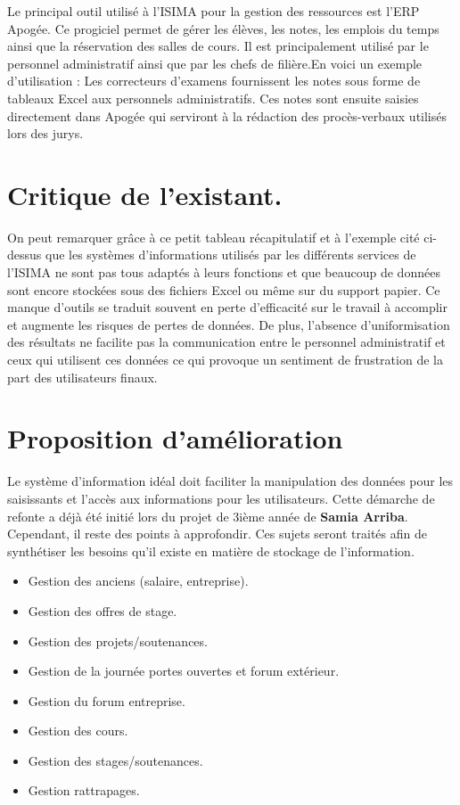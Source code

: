 \documentclass[a4paper,11pt]{report}
\begin{document}
\normalsize{
Le principal outil utilisé à l'ISIMA pour la gestion des ressources est l'ERP Apogée. Ce progiciel permet de gérer les élèves, les notes, les emplois du temps ainsi que la réservation des salles de cours. Il est principalement utilisé par le personnel administratif ainsi que par les chefs de filière.En voici un exemple d'utilisation : Les correcteurs d'examens fournissent les notes sous forme de tableaux Excel aux personnels administratifs. Ces notes sont ensuite saisies directement dans Apogée qui serviront à la rédaction des procès-verbaux utilisés lors des jurys. 
}

\section{Critique de l'existant.}
\normalsize{
On peut remarquer grâce à ce petit tableau récapitulatif et à l'exemple cité ci-dessus que les systèmes d'informations utilisés par les différents services de l'ISIMA ne sont pas tous adaptés à leurs fonctions et que beaucoup de données sont encore stockées sous des fichiers Excel ou même sur du support papier. Ce manque d'outils se traduit souvent en perte d'efficacité sur le travail à accomplir et augmente les risques de pertes de données. De plus, l'absence d'uniformisation des résultats ne facilite pas la communication entre le personnel administratif et ceux qui utilisent ces données ce qui provoque un sentiment de frustration de la part des utilisateurs finaux. \\
}

\section{Proposition d'amélioration}

\normalsize{
Le système d'information idéal doit faciliter la manipulation des données pour les saisissants et l'accès aux informations pour les utilisateurs. Cette démarche de refonte a déjà été initié lors du projet de 3ième année de {\bf Samia Arriba}. Cependant, il reste des points à approfondir. Ces sujets seront traités afin de synthétiser les besoins qu'il existe en matière de stockage de l'information.\\
}

\begin{itemize}
\item Gestion des anciens (salaire, entreprise).
\item Gestion des offres de stage.
\item Gestion des projets/soutenances.
\item Gestion de la journée portes ouvertes et forum extérieur.
\item Gestion du forum entreprise.
\item Gestion des cours.
\item Gestion des stages/soutenances.
\item Gestion rattrapages. \\
\end{itemize}
\end{document}
